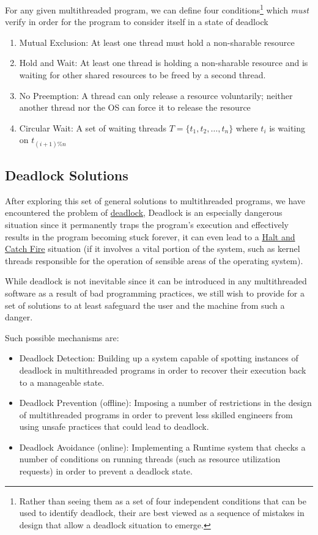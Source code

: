 \documentclass[openright, twoside]{report}
\theoremstyle{definition}
\theoremstyle{example}
\newcommand{\sequence}[2]{
		\{ #1_1, #1_2, \dots, #1_#2 \}
}
\begin{document}
			For any given multithreaded program, we can define four conditions\footnote{Rather than seeing them as
			a set of four independent conditions that can be used to identify deadlock, their are best viewed as a 
			sequence of mistakes in design that allow a deadlock situation to emerge.} which \emph{must}
			verify in order for the program to consider itself in a state of deadlock 
			\label{ssec:deadlock_conditions}
			\begin{enumerate}
				\item Mutual Exclusion: At least one thread must hold a non-sharable resource
				\item Hold and Wait: At least one thread is holding a non-sharable resource and is waiting 
				for other shared resources to be freed by a second thread.
				\item No Preemption: A thread can only release a resource voluntarily; neither 
				another thread nor the OS can force it to release the resource 
				\item Circular Wait: A set of waiting threads $T = \sequence{t}{n}$ where $t_i$ is waiting on $t_{(i+1)\%n}$
			\end{enumerate}

		\subsection{Deadlock Solutions}

			After exploring this set of general solutions to multithreaded programs, we have encountered the problem of \hyperref[sec:deadlock]{deadlock},
			Deadlock is an especially dangerous situation since it permanently traps the program's execution and effectively results in the program 
			becoming stuck forever, it can even lead to a 
			\href{https://en.wikipedia.org/wiki/Halt_and_Catch_Fire_(computing)}{Halt and Catch Fire} situation (if it involves a vital portion
			of the system, such as kernel threads responsible for the operation of sensible areas of the operating system).

			While deadlock is not inevitable since it can be introduced in any multithreaded software as a result of bad programming practices,
			we still wish to provide for a set of solutions to at least safeguard the user and the machine from such a danger.

			Such possible mechanisms are:
			\begin{itemize}
				\item Deadlock Detection: Building up a system capable of spotting instances of deadlock in multithreaded programs 
				in order to recover their execution back to a manageable state.
				\item Deadlock Prevention (offline): Imposing a number of restrictions in the design of multithreaded programs 
				in order to prevent less skilled engineers from using unsafe practices that could lead to deadlock. 
				\item Deadlock Avoidance (online): Implementing a Runtime system that checks a number of conditions on 
				running threads (such as resource utilization requests) in order to prevent a deadlock state.
			\end{itemize}
\end{document}
